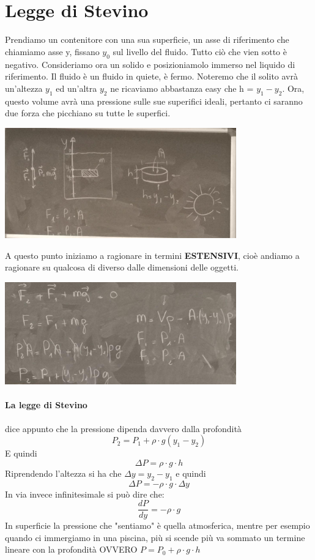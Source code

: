\documentclass[12pt, a4paper, openany, oneside]{book}
\begin{document}
\section{Legge di Stevino}
Prendiamo un contenitore con una sua superficie, un asse di riferimento che
chiamiamo asse y, fissano $y_{0}$ sul livello del fluido. Tutto ciò che vien 
sotto è negativo. 
Consideriamo ora un solido e posizioniamolo immerso nel liquido di riferimento.
Il fluido è un fluido in quiete, è fermo. Noteremo che il solito avrà un'altezza
$y_{1} $ ed un'altra $y_{2} $ ne ricaviamo abbastanza easy che h = $y_{1} - y_{2}$.
Ora, questo volume avrà una pressione sulle sue superifici ideali, pertanto ci 
saranno due forza che picchiano su tutte le superfici.
\begin{center}
\includegraphics[width=0.75\textwidth]{5}
\end{center}
A questo punto iniziamo a ragionare in termini \textbf{ESTENSIVI}, cioè andiamo
a ragionare su qualcosa di diverso dalle dimensioni delle oggetti. 
\begin{center}
\includegraphics[width=0.75\textwidth]{6}
\end{center}
\paragraph{La legge di Stevino} dice appunto che la pressione dipenda davvero 
dalla profondità 
\[
P_{2} = P_{1} + \rho \cdot g(y_{1} - y_{2})
\]
E quindi 
\[
\Delta P = \rho \cdot g \cdot h 
\]
Riprendendo l'altezza si ha che $\Delta y = y_{2} - y_{1}$ e quindi
\[
\Delta P = -\rho \cdot g \cdot \Delta y
\]
In via invece infinitesimale si può dire che:
\[
\frac{dP}{dy} = -\rho \cdot g
\]
In superficie la pressione che "sentiamo" è quella atmosferica, mentre per 
esempio quando ci immergiamo in una piscina, più si scende più va sommato un 
termine lineare con la profondità OVVERO $P = P_{0} + \rho \cdot g \cdot h$
\end{document}
